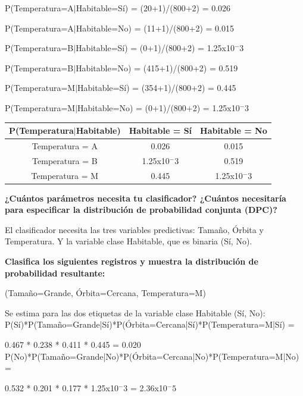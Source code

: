 \documentclass[11pt]{exam}
\begin{document}
\begin{questions}
P(Temperatura=A$|$Habitable=Sí) = (20+1)/(800+2) = 0.026

P(Temperatura=A$|$Habitable=No) = (11+1)/(800+2) = 0.015

P(Temperatura=B$|$Habitable=Sí) = (0+1)/(800+2) = 1.25x10$^-3$

P(Temperatura=B$|$Habitable=No) = (415+1)/(800+2) = 0.519

P(Temperatura=M$|$Habitable=Sí) = (354+1)/(800+2) = 0.445

P(Temperatura=M$|$Habitable=No) = (0+1)/(800+2) = 1.25x10$^-3$

\begin{center}
	\begin{tabular}{ |c|c|c| } 
		\hline
		P(Temperatura$|$Habitable) & Habitable = Sí & Habitable = No \\
		\hline
		Temperatura = A & 0.026 & 0.015 \\ 
		\hline
		Temperatura = B & 1.25x10$^-3$ & 0.519 \\ 
		\hline
		Temperatura = M & 0.445 & 1.25x10$^-3$ \\ 
		\hline
	\end{tabular}
\end{center}

{\bf \question ¿Cuántos parámetros necesita tu clasificador? ¿Cuántos necesitaría para especificar la distribución de probabilidad conjunta (DPC)?}

El clasificador necesita las tres variables predictivas: Tamaño, Órbita y Temperatura. Y la variable clase Habitable, que es binaria (Sí, No). 

{{\bf \question Clasifica los siguientes registros y muestra la distribución de probabilidad resultante:}

\begin{enumerate}
	{\bf \item (Tamaño=Grande, Órbita=Cercana, Temperatura=M)}
	
	Se estima para las dos etiquetas de la variable clase Habitable (Sí, No): \\
	
	P(Sí)*P(Tamaño=Grande|Sí)*P(Órbita=Cercana|Sí)*P(Temperatura=M|Sí) = 
	
	0.467 * 0.238 * 0.411 * 0.445 = 0.020 \\
	
	P(No)*P(Tamaño=Grande|No)*P(Órbita=Cercana|No)*P(Temperatura=M|No) =
	
	0.532 * 0.201 * 0.177 * 1.25x10$^-3$ = 2.36x10$^-5$ \\
	

\end{enumerate}}
\end{questions}
\end{document}
